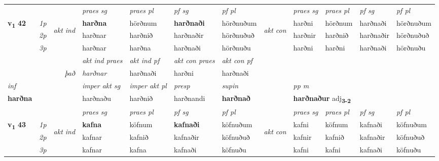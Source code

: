 \begin{longtable}[l]{X>{\footnotesize\itshape}llXXXXlXXXX}
 & &   & \textit{praes sg}  & \textit{praes pl}    & \textit{ pf sg} & \textit{pf pl} & & \textit{praes sg}  & \textit{praes pl}    & \textit{pf sg} & \textit{pf pl }  \\ \cmidrule{4-7} \cmidrule{9-12}
 \multirow{2}{*}{{{\textbf{v{\textsubscript{1}}} \Large{\textbf{42}}}}}  & 1p & \multirow{3}{*}{\begin{turn}{90}\textit{akt ind}\end{turn}} & \textbf{harðna} & hörðnum & \textbf{harðnaði} & hörðnuðum & \multirow{3}{*}{\begin{turn}{90}\textit{akt con}\end{turn}} &harðni & hörðnum & harðnaði & hörðnuðum\\*
 & 2p &  &  harðnar  & harðnið & harðnaðir & hörðnuðuð & & harðnir & harðnið & harðnaðir & hörðnuðuð \\*
 & 3p &  & harðnar & harðna & harðnaði & hörðnuðu & & harðni & harðni& harðnaði & hörðnuðu \\*
\cmidrule{4-7} \cmidrule{9-12}

   && &  \textit{akt ind praes} & \textit{akt ind pf} & \textit{akt con praes} & \textit{akt con pf} \\*
\multicolumn{3}{r}{\textit{það}} & harðnar & harðnaði & harðni & harðnaði \\*

\cmidrule{4-7}
   {\textit{inf}} & &  & \textit{imper akt sg} & \textit{imper akt pl}   & \textit{presp} & \textit{supin}  && \textit{pp m} \\*
  {\textbf{harðna}} & && harðnaðu  & harðnið   & harðnandi &  \textbf{harðnað}  && \multicolumn{2}{l}{\textbf{harðnaður} adj\textbf{\textsubscript{3-2}}} \\*

\midrule

 & &   & \textit{praes sg}  & \textit{praes pl}    & \textit{ pf sg} & \textit{pf pl} & & \textit{praes sg}  & \textit{praes pl}    & \textit{pf sg} & \textit{pf pl }  \\ \cmidrule{4-7} \cmidrule{9-12}
 \multirow{2}{*}{{{\textbf{v{\textsubscript{1}}} \Large{\textbf{43}}}}}  & 1p & \multirow{3}{*}{\begin{turn}{90}\textit{akt ind}\end{turn}} & \textbf{kafna} & köfnum & \textbf{kafnaði} & köfnuðum & \multirow{3}{*}{\begin{turn}{90}\textit{akt con}\end{turn}} &kafni & köfnum & kafnaði & köfnuðum\\*
 & 2p &  &  kafnar  & kafnið & kafnaðir & köfnuðuð & & kafnir & kafnið & kafnaðir & köfnuðuð \\*
 & 3p &  & kafnar & kafna & kafnaði & köfnuðu & & kafni & kafni& kafnaði & köfnuðu \\*
\cmidrule{4-7} \cmidrule{9-12}


\end{longtable}
